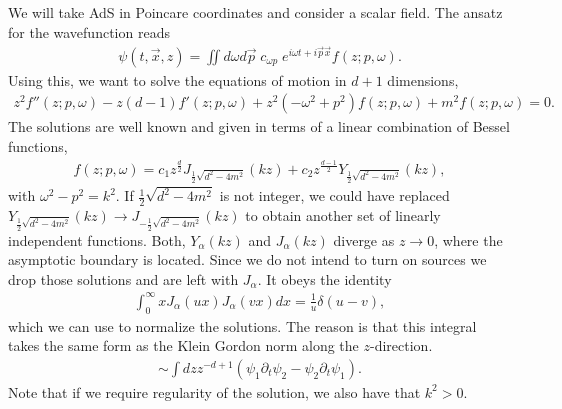 We will take AdS in Poincare coordinates and consider a scalar field. The ansatz for the wavefunction reads
\begin{align}
    \psi(t,\vec x,z) = \iint d\omega d\vec p \; c_{\omega p }\; e^{i \omega t + i \vec p \vec x} f(z;p,\omega).
\end{align}
Using this, we want to solve the equations of motion in $d+1$ dimensions,
\begin{align}
    z^2 f''(z;p,\omega) - z (d-1) f'(z;p,\omega) + z^2 (-\omega^2 + p^2) f(z;p,\omega) + m^2 f(z;p,\omega) = 0.
\end{align}
The solutions are well known and given in terms of a linear combination of Bessel functions,
\begin{align}
    f(z;p,\omega) = c_1 z^{\frac{d}{2}} J_{\frac 1 2 \sqrt{d^2 - 4m^2}}(k z) + c_2 z^{\frac{d-1}{2}} Y_{\frac 1 2 \sqrt{d^2 - 4m^2}}(k z),
\end{align}
with $\omega^2 - p^2 = k^2$. If $\frac 1 2 \sqrt{d^2 - 4m^2}$ is not integer, we could have replaced $Y_{\frac 1 2 \sqrt{d^2 - 4m^2}}(k z) \to J_{-\frac 1 2 \sqrt{d^2 - 4m^2}}(k z)$ to obtain another set of linearly independent functions. Both, $Y_\alpha(k z)$ and $J_\alpha(kz)$ diverge as $z \to 0$, where the asymptotic boundary is located. Since we do not intend to turn on sources we drop those solutions and are left with $J_\alpha$. It obeys the identity
\begin{align}
    \int_0^\infty x J_{\alpha}(ux) J_{\alpha}(vx) dx = \frac 1 u \delta(u-v),
\end{align}
which we can use to normalize the solutions. The reason is that this integral takes the same form as the Klein Gordon norm along the $z$-direction.
\begin{align}
    \sim \int dz z^{-d+1} (\psi_1 \partial_t \psi_2 - \psi_2 \partial_t \psi_1).
\end{align}
Note that if we require regularity of the solution, we also have that $k^2 > 0$.

